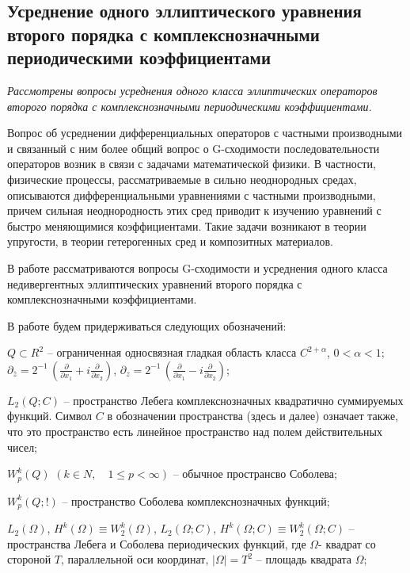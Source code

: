 
\subsection{Усреднение одного эллиптического уравнения второго порядка с комплекснозначными периодическими коэффициентами}

\textit{
    Рассмотрены вопросы усреднения одного класса эллиптических операторов второго порядка с комплекснозначными периодическими  коэффициентами.
}



Вопрос об усреднении дифференциальных операторов с частными производными и связанный с ним более общий вопрос о G-сходимости последовательности операторов возник в связи с задачами математической физики. В частности, физические процессы, рассматриваемые в сильно неоднородных средах, описываются дифференциальными уравнениями с частными производными, причем сильная неоднородность этих сред приводит к изучению уравнений с быстро меняющимися коэффициентами. Такие задачи возникают в теории упругости, в теории гетерогенных сред и композитных материалов.

В работе рассматриваются вопросы G-сходимости и усреднения одного класса недивергентных эллиптических уравнений второго порядка с комплекснозначными коэффициентами.

В работе будем придерживаться следующих обозначений:

$Q\subset R^{2} $ -- ограниченная односвязная гладкая область класса $C_{}^{2+\alpha } $, $0<\alpha <1$; $\partial _{\bar{z}} =2^{-1} \, \left(\frac{\partial }{\partial x_{1} } +i\frac{\partial }{\partial x_{2} } \right)$,      $\partial _{z} =2^{-1} \, \left(\frac{\partial }{\partial x_{1} } -i\frac{\partial }{\partial x_{2} } \right)$;

$L_{2} (Q;C)$ -- пространство Лебега комплекснозначных квадратично суммируемых функций. Символ $C$ в обозначении пространства (здесь и далее) означает также, что это пространство есть линейное пространство над полем действительных чисел;

$W_{p}^{k} (Q)$ $(k\in N,\quad 1\le p<\infty )$ -- обычное пространсво Соболева;

$W_{p}^{k} (Q;!)$ -- пространство Соболева комплекснозначных функций;

$L_{2} (\Omega )$, $H^{k} (\Omega )\equiv W_{2}^{k} (\Omega )$, $L_{2} (\Omega ;C)$, $H^{k} (\Omega ;C)\equiv W_{2}^{k} (\Omega ;C)$ -- пространства Лебега и Соболева периодических функций, где  $\Omega $- квадрат со стороной $T$,  параллельной оси координат, $|\Omega |=T^{2} $ -- площадь квадрата $\Omega $;

